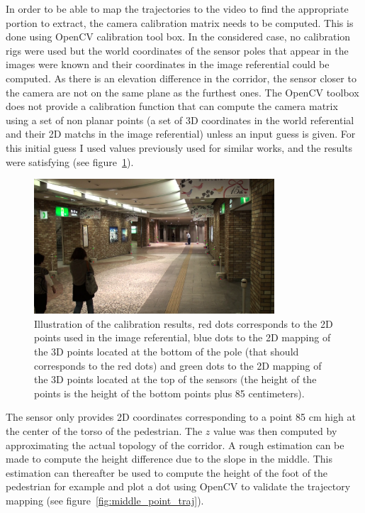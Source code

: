 \documentclass[12pt,a4paper,twoside]{article}
\begin{document}
In order to be able to map the trajectories to the video to find the appropriate portion to extract, the camera calibration matrix needs to be computed. This is done using OpenCV calibration tool box. In the considered case, no calibration rigs were used but the world coordinates of the sensor poles that appear in the images were known and their coordinates in the image referential could be computed. As there is an elevation difference in the corridor, the sensor closer to the camera are not on the same plane as the furthest ones. The OpenCV toolbox does not provide a calibration function that can compute the camera matrix using a set of non planar points (a set of 3D coordinates in the world referential and their 2D matchs in the image referential) unless an input guess is given. For this initial guess I used values previously used for similar works, and the results were satisfying (see figure~\ref{fig:calibration}).

\begin{figure}
    \centering
        \includegraphics[width=0.8\textwidth]{images/calibration}
    \caption{Illustration of the calibration results, red dots corresponds to the 2D points used in the image referential, blue dots to the 2D mapping of the 3D points located at the bottom of the pole (that should corresponds to the red dots) and green dots to the 2D mapping of the 3D points located at the top of the sensors (the height of the points is the height of the bottom points plus 85 centimeters). }
    \label{fig:calibration}
\end{figure}

The sensor only provides 2D coordinates corresponding to a point 85 cm high at the center of the torso of the pedestrian. The $z$ value was then computed by approximating the actual topology of the corridor. A rough estimation can be made to compute the height difference due to the slope in the middle. This estimation can thereafter be used to compute the height of the foot of the pedestrian for example and plot a dot using OpenCV to validate the trajectory mapping (see figure~\ref{fig:middle_point_traj}).
\end{document}
